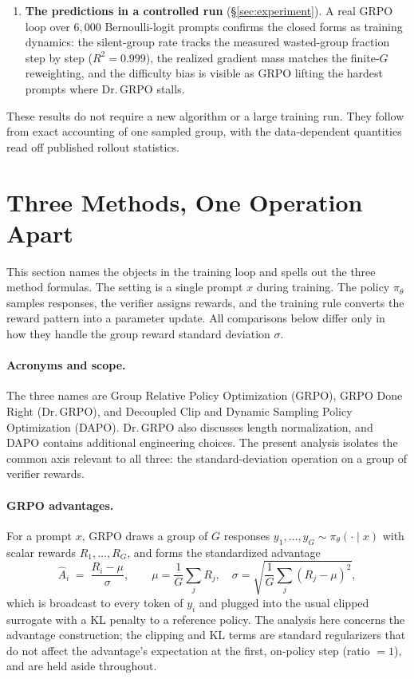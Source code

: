 \documentclass[11pt]{article}
\theoremstyle{plain}
\theoremstyle{definition}
\newcommand{\Adv}{\hat{A}}
\begin{document}
\begin{enumerate}
\item \textbf{The predictions in a controlled run} (\S\ref{sec:experiment}). A real GRPO loop over $6{,}000$ Bernoulli-logit prompts confirms the closed forms as training dynamics: the silent-group rate tracks the measured wasted-group fraction step by step ($R^2=0.999$), the realized gradient mass matches the finite-$G$ reweighting, and the difficulty bias is visible as GRPO lifting the hardest prompts where Dr.\,GRPO stalls.
\end{enumerate}
These results do not require a new algorithm or a large training run. They follow from exact accounting of one sampled group, with the data-dependent quantities read off published rollout statistics.

\section{Three Methods, One Operation Apart}
\label{sec:setup}

This section names the objects in the training loop and spells out the three method formulas. The setting is a single prompt $x$ during training. The policy $\pi_\theta$ samples responses, the verifier assigns rewards, and the training rule converts the reward pattern into a parameter update. All comparisons below differ only in how they handle the group reward standard deviation $\sigma$.

\paragraph{Acronyms and scope.} The three names are Group Relative Policy Optimization (GRPO), GRPO Done Right (Dr.\,GRPO), and Decoupled Clip and Dynamic Sampling Policy Optimization (DAPO). Dr.\,GRPO also discusses length normalization, and DAPO contains additional engineering choices. The present analysis isolates the common axis relevant to all three: the standard-deviation operation on a group of verifier rewards.

\paragraph{GRPO advantages.} For a prompt $x$, GRPO draws a group of $G$ responses $y_1,\dots,y_G\sim\pi_\theta(\cdot\mid x)$ with scalar rewards $R_1,\dots,R_G$, and forms the standardized advantage
\begin{equation}
\label{eq:adv}
\Adv_i \;=\; \frac{R_i-\mu}{\sigma},\qquad
\mu=\frac1G\sum_{j}R_j,\quad
\sigma=\sqrt{\frac1G\sum_j (R_j-\mu)^2},
\end{equation}
which is broadcast to every token of $y_i$ and plugged into the usual clipped surrogate with a KL penalty to a reference policy. The analysis here concerns the advantage construction; the clipping and KL terms are standard regularizers that do not affect the advantage's expectation at the first, on-policy step (ratio $=1$), and are held aside throughout.
\end{document}
